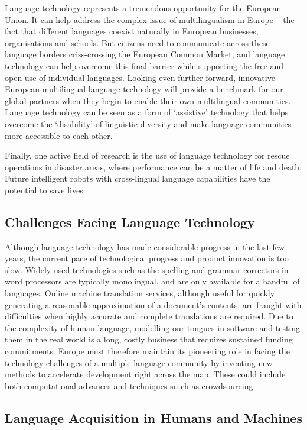 \begin{multicols}{2}
Language technology represents a tremendous opportunity for the European Union. It can help address the complex issue of multilingualism in Europe – the fact that different languages coexist naturally in European businesses, organisations and schools. But citizens need to communicate across these language borders criss-crossing the European Common Market, and language technology can help overcome this final barrier while supporting the free and open use of individual languages. Looking even further forward, innovative European multilingual language technology will provide a benchmark for our global partners when they begin to enable their own multilingual communities. Language technology can be seen as a form of ‘assistive’ technology that helps overcome the ‘disability’ of linguistic diversity and make language communities more accessible to each other.

Finally, one active field of research is the use of language technology for rescue operations in disaster areas, where performance can be a matter of life and death: Future intelligent robots with cross-lingual language capabilities have the potential to save lives. 


\subsection{Challenges Facing Language Technology}

Although language technology has made considerable progress in the last few years, the current pace of technological progress and product innovation is too slow. Widely-used technologies such as the spelling and grammar correctors in word processors are typically monolingual, and are only available for a handful of languages. Online machine translation services, although useful for quickly generating a reasonable approximation of a document’s contents, are fraught with difficulties when highly accurate and complete translations are required. Due to the complexity of human language, modelling our tongues in software and testing them in the real world is a long, costly business that requires sustained funding commitments. Europe must therefore maintain its pioneering role in facing the technology challenges of a multiple-language community by inventing new methods to accelerate development right across the map. These could include both computational advances and techniques su
 ch as crowdsourcing.

\subsection{Language Acquisition in Humans and Machines}


\end{multicols}

